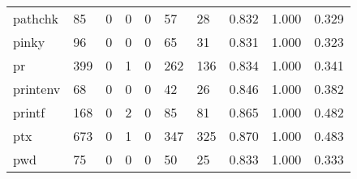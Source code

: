 \begin{longtable}{lp{2.0cm}p{2.0cm}p{2.0cm}p{2.0cm}p{2.0cm}p{2.0cm}p{2.0cm}p{2.0cm}p{2.0cm}}
pathchk   &                     85 &                                             0 &                                            0 &                                           0 &                                           57 &                                         28 &                                0.832 &                                  1.000 &                                0.329 \\
pinky     &                     96 &                                             0 &                                            0 &                                           0 &                                           65 &                                         31 &                                0.831 &                                  1.000 &                                0.323 \\
pr        &                    399 &                                             0 &                                            1 &                                           0 &                                          262 &                                        136 &                                0.834 &                                  1.000 &                                0.341 \\
printenv  &                     68 &                                             0 &                                            0 &                                           0 &                                           42 &                                         26 &                                0.846 &                                  1.000 &                                0.382 \\
printf    &                    168 &                                             0 &                                            2 &                                           0 &                                           85 &                                         81 &                                0.865 &                                  1.000 &                                0.482 \\
ptx       &                    673 &                                             0 &                                            1 &                                           0 &                                          347 &                                        325 &                                0.870 &                                  1.000 &                                0.483 \\
pwd       &                     75 &                                             0 &                                            0 &                                           0 &                                           50 &                                         25 &                                0.833 &                                  1.000 &                                0.333 \\

\end{longtable}
